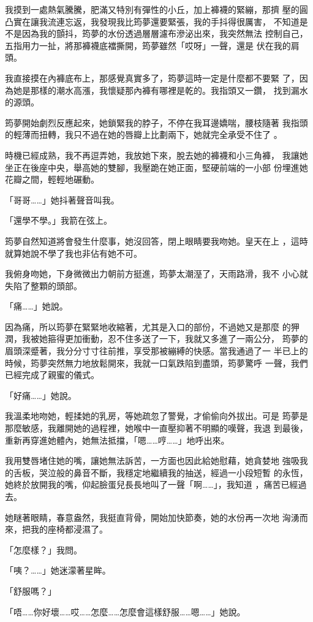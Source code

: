 我摸到一處熱氣騰騰，肥滿又特別有彈性的小丘，加上褲襪的緊繃，那擠
壓的圓凸實在讓我流連忘返，我發現我比筠夢還要緊張，我的手抖得很厲害，
不知道是不是因為我的顫抖，筠夢的水份透過層層濾布滲泌出來，我突然無法
控制自己，五指用力一扯，將那褲襪底襠撕開，筠夢雖然「哎呀」一聲，還是
伏在我的肩頭。

我直接摸在內褲底布上，那感覺真實多了，筠夢這時一定是什麼都不要緊
了，因為她是那樣的潮水高漲，我懷疑那內褲有哪裡是乾的。我指頭又一鑽，
找到漏水的源頭。

筠夢開始劇烈反應起來，她鎖緊我的脖子，不停在我耳邊嬌喘，腰枝隨著
我指頭的輕薄而扭轉，我只不過在她的唇瓣上比劃兩下，她就完全承受不住了
。

時機已經成熟，我不再逗弄她，我放她下來，脫去她的褲襪和小三角褲，
我讓她坐正在後座中央，舉高她的雙腳，我壓跪在她正面，堅硬前端的一小部
份埋進她花瓣之間，輕輕地碾動。

「哥哥……」她抖著聲音叫我。

「還學不學。」我箭在弦上。

筠夢自然知道將會發生什麼事，她沒回答，閉上眼睛要我吻她。皇天在上
，這時就算她說不學了我也非佔有她不可。

我俯身吻她，下身微微出力朝前方挺進，筠夢太潮溼了，天雨路滑，我不
小心就失陷了整顆的頭部。

「痛……」她說。

因為痛，所以筠夢在緊緊地收縮著，尤其是入口的部份，不過她又是那麼
的狎潤，我被她箍得更加衝動，忍不住多送了一下，我就又多進了一兩公分，
筠夢的眉頭深蹙著，我分分寸寸往前推，享受那被繃縛的快感。當我通過了一
半已上的時候，筠夢突然無力地放鬆開來，我就一口氣跌陷到盡頭，筠夢驚呼
一聲，我們已經完成了親蜜的儀式。

「好痛……」她說。

我溫柔地吻她，輕揉她的乳房，等她疏忽了警覺，才偷偷向外拔出。可是
筠夢是那麼敏感，我離開她的過程裡，她喉中一直壓抑著不明顯的嘆聲，我退
到最後，重新再穿進她體內，她無法抵擋，「嗯……哼……」地呼出來。

我用雙唇堵住她的嘴，讓她無法訴苦，一方面也因此給她慰藉，她貪婪地
強吸我的舌板，哭泣般的鼻音不斷，我穩定地繼續我的抽送，經過一小段短暫
的永恆，她終於放開我的嘴，仰起臉蛋兒長長地叫了一聲「啊……」，我知道
，痛苦已經過去。

她瞇著眼睛，春意盎然，我挺直背骨，開始加快節奏，她的水份再一次地
洶湧而來，把我的座椅都浸濕了。

「怎麼樣？」我問。

「咦？……」她迷濛著星眸。

「舒服嗎？」

「唔……你好壞……哎……怎麼……怎麼會這樣舒服……嗯……」她說。

